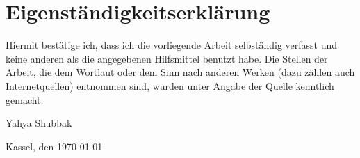 \chapter{Eigenständigkeitserklärung}
Hiermit bestätige ich, dass ich die vorliegende Arbeit selbständig verfasst und keine
anderen als die angegebenen Hilfsmittel benutzt habe. Die Stellen der Arbeit, die dem
Wortlaut oder dem Sinn nach anderen Werken (dazu zählen auch Internetquellen)
entnommen sind, wurden unter Angabe der Quelle kenntlich gemacht.

\begin{minipage}{0.4\textwidth}
    \vspace*{10ex}
    Yahya Shubbak
\end{minipage}\hfill
\begin{minipage}{0.4\textwidth}
    \vspace*{10ex}
    Kassel, den \today
\end{minipage}

